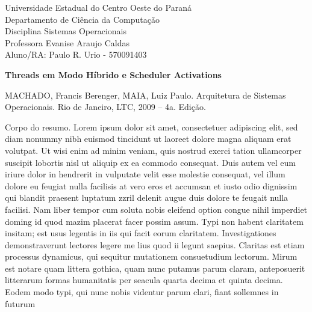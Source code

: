 \documentclass[espacomeio]{abnt}
\begin{document}
\begin{center}
Universidade Estadual do Centro Oeste do Paraná \\
Departamento de Ciência da Computação \\
Disciplina Sistemas Operacionais \\
Professora Evanise Araujo Caldas \\
Aluno/RA: Paulo R. Urio - 570091403
\end{center}

\textbf{Threads em Modo Híbrido e Scheduler Activations}

MACHADO, Francis Berenger, MAIA,
Luiz Paulo. Arquitetura de Sistemas
Operacionais. Rio de Janeiro, LTC, 2009
-- 4a. Edição.

Corpo do resumo. Lorem ipsum dolor sit amet, consectetuer adipiscing elit, sed diam nonummy nibh euismod tincidunt ut laoreet dolore magna aliquam erat volutpat. Ut wisi enim ad minim veniam, quis nostrud exerci tation ullamcorper suscipit lobortis nisl ut aliquip ex ea commodo consequat. Duis autem vel eum iriure dolor in hendrerit in vulputate velit esse molestie consequat, vel illum dolore eu feugiat nulla facilisis at vero eros et accumsan et iusto odio dignissim qui blandit praesent luptatum zzril delenit augue duis dolore te feugait nulla facilisi. Nam liber tempor cum soluta nobis eleifend option congue nihil imperdiet doming id quod mazim placerat facer possim assum. Typi non habent claritatem insitam; est usus legentis in iis qui facit eorum claritatem. Investigationes demonstraverunt lectores legere me lius quod ii legunt saepius. Claritas est etiam processus dynamicus, qui sequitur mutationem consuetudium lectorum. Mirum est notare quam littera gothica, quam nunc putamus parum claram, anteposuerit litterarum formas humanitatis per seacula quarta decima et quinta decima. Eodem modo typi, qui nunc nobis videntur parum clari, fiant sollemnes in futurum
\end{document}
